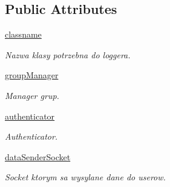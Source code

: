 \subsection*{Public Attributes}
\begin{CompactItemize}
\item 
\hypertarget{class_serv_1_1_parser_1_1_parser_98309dc29b98b9dbbaba8175bc6fce00}{
\hyperlink{class_serv_1_1_parser_1_1_parser_98309dc29b98b9dbbaba8175bc6fce00}{classname}}
\label{class_serv_1_1_parser_1_1_parser_98309dc29b98b9dbbaba8175bc6fce00}

\begin{CompactList}\small\item\em Nazwa klasy potrzebna do loggera. \item\end{CompactList}\item 
\hypertarget{class_serv_1_1_parser_1_1_parser_8e8fc28fb138a84f24593294eba5a237}{
\hyperlink{class_serv_1_1_parser_1_1_parser_8e8fc28fb138a84f24593294eba5a237}{groupManager}}
\label{class_serv_1_1_parser_1_1_parser_8e8fc28fb138a84f24593294eba5a237}

\begin{CompactList}\small\item\em Manager grup. \item\end{CompactList}\item 
\hypertarget{class_serv_1_1_parser_1_1_parser_59f3263667252c32bbe04baf2db0c12e}{
\hyperlink{class_serv_1_1_parser_1_1_parser_59f3263667252c32bbe04baf2db0c12e}{authenticator}}
\label{class_serv_1_1_parser_1_1_parser_59f3263667252c32bbe04baf2db0c12e}

\begin{CompactList}\small\item\em Authenticator. \item\end{CompactList}\item 
\hypertarget{class_serv_1_1_parser_1_1_parser_db376d9d8d99afa93fa43b3ca8153e9f}{
\hyperlink{class_serv_1_1_parser_1_1_parser_db376d9d8d99afa93fa43b3ca8153e9f}{dataSenderSocket}}
\label{class_serv_1_1_parser_1_1_parser_db376d9d8d99afa93fa43b3ca8153e9f}

\begin{CompactList}\small\item\em Socket ktorym sa wysylane dane do userow. \item\end{CompactList}\end{CompactItemize}


